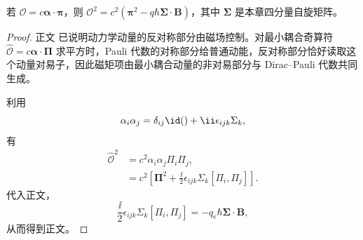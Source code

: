 \begin{lemma}
若 $\mathcal O=c\boldsymbol\alpha\cdot\boldsymbol\pi$，则 $\mathcal O^2=c^2(\boldsymbol\pi^2-q\hbar\boldsymbol\Sigma\cdot\mathbf B)$，其中 $\boldsymbol\Sigma$ 是本章四分量自旋矩阵。
\end{lemma}
\begin{proof}
正文 已说明动力学动量的反对称部分由磁场控制。对最小耦合奇算符 $\hat{\mathcal O}=c\boldsymbol\alpha\cdot\boldsymbol\Pi$ 求平方时，Pauli 代数的对称部分给普通动能，反对称部分恰好读取这个动量对易子，因此磁矩项由最小耦合动量的非对易部分与 Dirac--Pauli 代数共同生成。

利用
\begin{equation*}
 \alpha_i\alpha_j
 =\delta_{ij}\id()+\ii\epsilon_{ijk}\Sigma_k,
\end{equation*}
有
\begin{align*}
 \hat{\mathcal O}^2
 &=c^2\alpha_i\alpha_j\Pi_i\Pi_j,\\
 &=c^2\left[
 \boldsymbol\Pi^2
 +\frac{\ii}{2}\epsilon_{ijk}\Sigma_k[\Pi_i,\Pi_j]
 \right].
\end{align*}
代入正文，
\begin{equation*}
 \frac{\ii}{2}\epsilon_{ijk}\Sigma_k[\Pi_i,\Pi_j]
 =-q_{\mathrm e}\hbar\boldsymbol\Sigma\cdot\mathbf B,
\end{equation*}
从而得到正文。
\end{proof}

